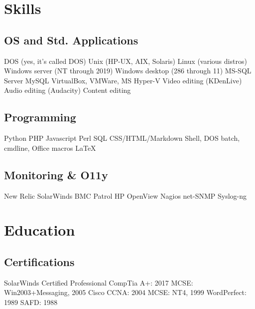 \documentclass[]{deedy-resume-openfont}
\begin{document}
\begin{minipage}[t]{0.33\textwidth} 


\section{Skills}
\subsection{OS and Std. Applications}
\textbullet{}DOS (yes, it's called DOS)
\textbullet{}Unix (HP-UX, AIX, Solaris)
\textbullet{}Linux (various distros)\linebreak
\textbullet{}Windows server (NT through 2019)
\textbullet{}Windows desktop (286 through 11)
\textbullet{}MS-SQL Server
\textbullet{}MySQL\linebreak
\textbullet{}VirtualBox, VMWare, MS Hyper-V
\textbullet{}Video editing (KDenLive)
\textbullet{}Audio editing (Audacity)
\textbullet{}Content editing
\vspace{\topsep}

\subsection{Programming}
\textbullet{}Python
\textbullet{}PHP
\textbullet{}Javascript
\textbullet{}Perl
\textbullet{}SQL
\textbullet{}CSS/HTML/Markdown
\textbullet{}Shell, DOS batch, cmdline, Office macros
\textbullet{}\LaTeX 
\vspace{\topsep}

\subsection{Monitoring \& O11y}
\textbullet{}New Relic
\textbullet{}SolarWinds
\textbullet{}BMC Patrol
\textbullet{}HP OpenView
\textbullet{}Nagios
\textbullet{}net-SNMP
\textbullet{}Syslog-ng
\vspace{\topsep}


\section{Education} 
\subsection{Certifications}
\textbullet{}SolarWinds Certified Professional
\textbullet{}CompTia A+: 2017
\textbullet{}MCSE: Win2003+Messaging, 2005
\textbullet{}Cisco CCNA: 2004
\textbullet{}MCSE: NT4, 1999
\textbullet{}WordPerfect: 1989
\textbullet{}SAFD: 1988
\sectionsep

\end{minipage}
\end{document}
